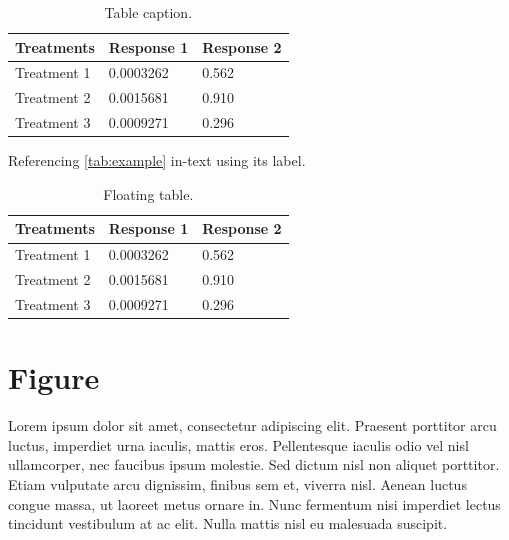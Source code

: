 \documentclass[
	11pt, %
	fleqn, %
	a4paper, %
	oneside, %
]{LegrandOrangeBook}
\begin{document}
\begin{table}[H] %
	\centering %
	\begin{tabular}{L{0.15\textwidth} R{0.15\textwidth} R{0.15\textwidth}} %
		\toprule
		\textbf{Treatments} & \textbf{Response 1} & \textbf{Response 2}\\
		\midrule
		Treatment 1 & 0.0003262 & 0.562 \\
		Treatment 2 & 0.0015681 & 0.910 \\
		Treatment 3 & 0.0009271 & 0.296 \\
		\bottomrule
	\end{tabular}
	\caption{Table caption.}
	\label{tab:example} %
\end{table}

Referencing \autoref{tab:example} in-text using its label.

\begin{table}[t] %
	\centering %
	\begin{tabular}{L{0.15\textwidth} R{0.15\textwidth} R{0.15\textwidth}} %
		\toprule
		\textbf{Treatments} & \textbf{Response 1} & \textbf{Response 2}\\
		\midrule
		Treatment 1 & 0.0003262 & 0.562 \\
		Treatment 2 & 0.0015681 & 0.910 \\
		Treatment 3 & 0.0009271 & 0.296 \\
		\bottomrule
	\end{tabular}
	\caption{Floating table.}
	\label{tab:floating} %
\end{table}


\section{Figure}

Lorem ipsum dolor sit amet, consectetur adipiscing elit. Praesent porttitor arcu luctus, imperdiet urna iaculis, mattis eros. Pellentesque iaculis odio vel nisl ullamcorper, nec faucibus ipsum molestie. Sed dictum nisl non aliquet porttitor. Etiam vulputate arcu dignissim, finibus sem et, viverra nisl. Aenean luctus congue massa, ut laoreet metus ornare in. Nunc fermentum nisi imperdiet lectus tincidunt vestibulum at ac elit. Nulla mattis nisl eu malesuada suscipit.
\end{document}
